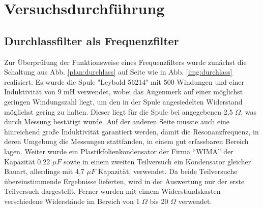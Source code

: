 \section{Versuchsdurchführung}
\subsection{Durchlassfilter als Frequenzfilter}
Zur Überprüfung der Funktionsweise eines Frequenzfilters wurde zunächst die Schaltung aus
Abb. \ref{plan:durchlass} auf Seite \pageref{plan:durchlass} wie in Abb. \ref{img:durchlass} realisiert. Es wurde die Spule "Leybold 56214" mit 500 Windungen und einer Induktivität von 9 mH verwendet, wobei das Augenmerk auf einer möglichst geringen Windungszahl liegt, um den in der Spule angesiedelten Widerstand möglichst gering zu halten. Dieser liegt für die Spule bei angegebenen 2,5 $ \Omega $, was durch Messung bestätigt wurde. Auf
der anderen Seite musste auch eine hinreichend große Induktivität garantiert werden, damit die Resonanzfrequenz, in deren Umgebung die Messungen stattfanden, in einem gut erfassbaren Bereich lagen. Weiter wurde ein Plastikfolienkondensator der Firma \enquote{WIMA} der Kapazität 0,22 $  \mu F $ sowie in einem zweiten Teilversuch ein Kondensator gleicher Bauart, allerdings mit 4,7 $  \mu F $ Kapazität, verwendet. Da beide Teilversuche übereinstimmende Ergebnisse lieferten, wird in der Auswertung nur der erste Teilversuch dargestellt. Ferner wurden
mit eimem Widerstandskasten verschiedene Widerstände im Bereich von 1 $ \Omega $ bis 20 $ \Omega $ verwendet.
